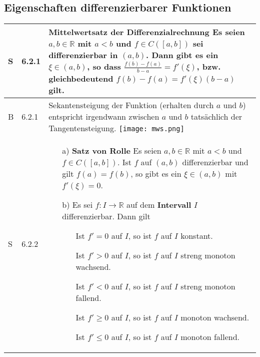 \pagebreak

\subsection{Eigenschaften differenzierbarer Funktionen}

    \begin{longtable}{p{0.75cm} p{1cm} p{16cm}}
        \toprule
        S   & 6.2.1 &   \textbf{Mittelwertsatz der Differenzialrechnung} \hfill \break
                        Es seien $a,b \in \mathbb{R}$ mit $a < b$ und $f \in C([a,b])$ sei differenzierbar in $(a,b)$. Dann gibt es ein
                        $\xi \in (a,b)$, so dass $\frac{f(b)-f(a)}{b-a} = f'(\xi)$, bzw. gleichbedeutend $f(b) - f(a) = f'(\xi)(b-a)$ gilt. \\
        \midrule
        B   & 6.2.1 &   Sekantensteigung der Funktion (erhalten durch $a$ und $b$) entspricht irgendwann zwischen $a$ und $b$ tatsächlich
                        der Tangentensteigung. \hfill \break
                        \texttt{[image: mws.png]} \\
        \midrule
        S   & 6.2.2 &   \begin{itemize}[topsep=-0.5cm]
                            \item[a)] \textbf{Satz von Rolle} \hfill \break
                                        Es seien $a, b \in \mathbb{R}$ mit $a < b$ und $f \in C([a,b])$. Ist $f$ auf $(a,b)$ differenzierbar
                                        und gilt $f(a) = f(b)$, so gibt es ein $\xi \in (a,b)$ mit $f'(\xi) = 0$.
                            \item[b)] Es sei $f: I \rightarrow \mathbb{R}$ auf dem \textbf{Intervall} $I$ differenzierbar. Dann gilt
                                        \begin{itemize}[topsep=-0.5cm]
                                            \item[] Ist $f' = 0$ auf $I$, so ist $f$ auf $I$ konstant.
                                            \item[] Ist $f' > 0$ auf $I$, so ist $f$ auf $I$ streng monoton wachsend.
                                            \item[] Ist $f' < 0$ auf $I$, so ist $f$ auf $I$ streng monoton fallend.
                                            \item[] Ist $f' \geq 0$ auf $I$, so ist $f$ auf $I$ monoton wachsend.
                                            \item[] Ist $f' \leq 0$ auf $I$, so ist $f$ auf $I$ monoton fallend.

\end{itemize}
\end{itemize}
\end{longtable}
